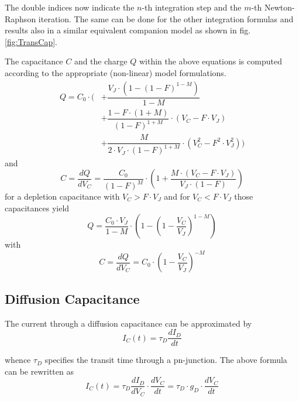 The double indices now indicate the $n$-th integration step and the
$m$-th Newton-Raphson iteration.  The same can be done for the other
integration formulas and results also in a similar equivalent
companion model as shown in fig. \ref{fig:TransCap}.

\addvspace{12pt}

The capacitance $C$ and the charge $Q$ within the above equations is
computed according to the appropriate (non-linear) model formulations.
\begin{equation}
\begin{split}
Q = C_0\cdot \Biggl(
& + \dfrac{V_J\cdot \left(1- \left(1 - F\right)^{1-M}\right)}{1-M}\\
& + \dfrac{1 - F\cdot\left(1 + M\right)}{\left(1-F\right)^{1+M}} \cdot \left(V_C - F\cdot V_J\right)\\
& + \dfrac{M}{2\cdot V_J \cdot \left(1-F\right)^{1+M}} \cdot\left(V_C^2 - F^2\cdot V_J^2\right) \Biggr)
\end{split}
\end{equation}
and
\begin{equation}
C = \dfrac{d Q}{d V_C} = \dfrac{C_0}{\left(1 - F\right)^M}\cdot \left(1 + \dfrac{M\cdot \left(V_C - F\cdot V_J\right)}{V_J\cdot \left(1 - F\right)}\right)
\end{equation}
for a depletion capacitance with $V_C > F\cdot V_J$ and for $V_C <
F\cdot V_J$ those capacitances yield
\begin{equation}
Q = \dfrac{C_0\cdot V_J}{1-M}\cdot\left(1-\left(1 - \dfrac{V_C}{V_J}\right)^{1-M}\right)
\end{equation}
with
\begin{equation}
C = \dfrac{d Q}{d V_C} = C_{0}\cdot \left(1 - \dfrac{V_{C}}{V_{J}}\right)^{-M}
\end{equation}

\subsection{Diffusion Capacitance}

The current through a diffusion capacitance can be approximated by
\begin{equation}
I_C(t) = \tau_D \dfrac{d I_D}{d t}
\end{equation}

whence $\tau_D$ specifies the transit time through a pn-junction.  The
above formula can be rewritten as
\begin{equation}
I_C(t) = \tau_D \dfrac{d I_D}{d V_C}\cdot \dfrac{d V_C}{d t} = \tau_D \cdot g_D \cdot \dfrac{d V_C}{d t}
\end{equation}

